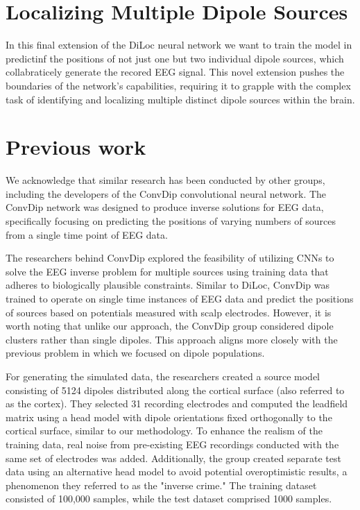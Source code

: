 \documentclass[a4paper, UKenglish, 11pt]{uiomaster}
\begin{document}
\begin{table}[]
\begin{tabular}
    \end{tabular}
    \caption{\textbf{Evaluation of DiLoc utilizing different Error Metrics.}
    Performance of the extended DiLoc network on a test dataset consisting of 20000 samples. The errors are measured using Mean Absolute Error (MAE), Mean Absolute Percentage Error (MAPE), Mean Squared Error (MSE), and Root Mean Squared Error (RMSE) for various target values.}
    \label{table:error_dipole_area}
    \end{table}



\section{Localizing Multiple Dipole Sources}
In this final extension of the DiLoc neural network we want to train the model in predictinf the positions of not just one but two individual dipole sources, which collabraticely generate the recored EEG signal. This novel extension pushes the boundaries of the network's capabilities, requiring it to grapple with the complex task of identifying and localizing multiple distinct dipole sources within the brain.

\section{Previous work}
We acknowledge that similar research has been conducted by other groups, including the developers of the ConvDip convolutional neural network. The ConvDip network was designed to produce inverse solutions for EEG data, specifically focusing on predicting the positions of varying numbers of sources from a single time point of EEG data.

The researchers behind ConvDip explored the feasibility of utilizing CNNs to solve the EEG inverse problem for multiple sources using training data that adheres to biologically plausible constraints. Similar to DiLoc, ConvDip was trained to operate on single time instances of EEG data and predict the positions of sources based on potentials measured with scalp electrodes. However, it is worth noting that unlike our approach, the ConvDip group considered dipole clusters rather than single dipoles. This approach aligns more closely with the previous problem in which we focused on dipole populations.

For generating the simulated data, the researchers created a source model consisting of 5124 dipoles distributed along the cortical surface (also referred to as the cortex). They selected 31 recording electrodes and computed the leadfield matrix using a head model with dipole orientations fixed orthogonally to the cortical surface, similar to our methodology. To enhance the realism of the training data, real noise from pre-existing EEG recordings conducted with the same set of electrodes was added. Additionally, the group created separate test data using an alternative head model to avoid potential overoptimistic results, a phenomenon they referred to as the "inverse crime." The training dataset consisted of 100,000 samples, while the test dataset comprised 1000 samples.
\end{document}
